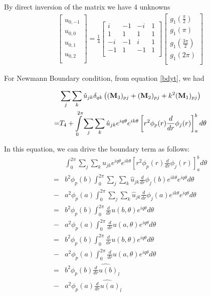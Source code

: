 By direct inversion of the matrix we have 4 unknowns
\begin{eqnarray}
\begin{bmatrix}
    \hat u_{0,-1} \\
    \hat u_{0,0} \\
    \hat u_{0,1} \\
    \hat u_{0,2} \\
\end{bmatrix}
= \frac{1}{4}
\begin{bmatrix}
    i&-1&-i&1\\
    1&1&1&1\\
    -i&-1&i&1\\
    -1&1&-1&1\\
\end{bmatrix}
\begin{bmatrix}
    g_1(\frac{\pi}{2}) \\
    g_1(\pi) \\
    g_1(\frac{3\pi}{2}) \\
    g_1(2\pi) \\
\end{bmatrix}
\end{eqnarray}

For Newmann Boundary condition, from equation \ref{bdyt}, we had

\begin{eqnarray} \label{bdyt}
&\sum_j \sum_k \hat{u}_{jk} \delta_{qk} \left( ({\bf M}_3)_{pj} + ({\bf M}_2)_{pj} + k^2 ({\bf M}_1)_{pj} \right)\\
= &T_4 + \int_0^{2\pi} \sum_j \sum_k \hat{u}_{jk} e^{iq\theta} e^{ik\theta} \left[r^2 \phi_p(r) \frac{d}{dr}\phi_j(r)\right]_a^b d\theta
\end{eqnarray}

In this equation, we can drive the boundary term as follows:
\begin{eqnarray} \label{bdyt}
&\int_0^{2\pi} \sum_j \sum_k \hat{u}_{jk} e^{iq\theta} e^{ik\theta} \left[r^2 \phi_p(r) \frac{d}{dr}\phi_j(r)\right]_a^b d\theta \\
=&b^2\phi_p(b) \int_0^{2\pi} \sum_j \sum_k \hat{u}_{jk} \frac{d}{dr}\phi_j(b) e^{ik\theta} e^{iq\theta} d\theta \\
-&a^2\phi_p(a) \int_0^{2\pi} \sum_j \sum_k \hat{u}_{jk} \frac{d}{dr}\phi_j(a) e^{ik\theta} e^{iq\theta} d\theta \\
=&b^2\phi_p(b) \int_0^{2\pi} \frac{d}{dr}u(b, \theta) e^{iq\theta} d\theta \\
-&a^2\phi_p(a) \int_0^{2\pi} \frac{d}{dr}u(a, \theta) e^{iq\theta} d\theta \\
=&b^2\phi_p(b) \int_0^{2\pi} \frac{d}{dr}u(b, \theta) e^{iq\theta} d\theta \\
-&a^2\phi_p(a) \int_0^{2\pi} \frac{d}{dr}u(a, \theta) e^{iq\theta} d\theta \\
=&b^2\phi_p(b) \widehat{ \frac{d}{dr}u(b) }_l \\
-&a^2\phi_p(a) \widehat{ \frac{d}{dr}u(a) }_l \\
\end{eqnarray}

